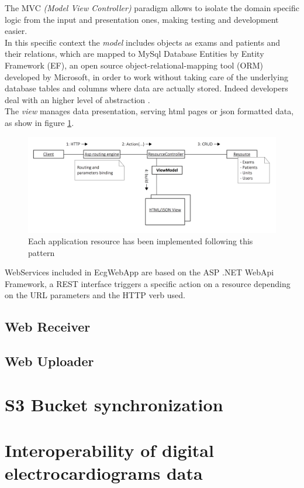 The MVC \textit{(Model View Controller)} paradigm allows to isolate the domain specific logic from the input and presentation ones, making testing and development easier. \cite{mvc}\\
In this specific context the \textit{model} includes objects as exams and patients and their relations, which are mapped to MySql Database Entities by Entity Framework (EF), an open source object-relational-mapping tool (ORM) developed by Microsoft, in order to work without taking care of the underlying database tables and columns where data are actually stored. Indeed developers deal with an higher level of abstraction \cite{wikipedia_ef}.\\
The \textit{view} manages data presentation, serving html pages or json formatted data, as show in figure \ref{fig:app_resource_pattern}.\\
\begin{figure}[h]
    \includegraphics[width=\textwidth]{img/app_resource_pattern}
    \caption{Each application resource has been implemented following this pattern}
    \label{fig:app_resource_pattern}
\end{figure}
WebServices included in EcgWebApp are based on the ASP .NET WebApi Framework, a REST interface triggers a specific action on a resource depending on the URL parameters and the HTTP verb used.

\subsection{Web Receiver}
\label{subsection:webreceiver}
\subsection{Web Uploader}
\section{S3 Bucket synchronization}
\section{Interoperability of digital electrocardiograms data}
